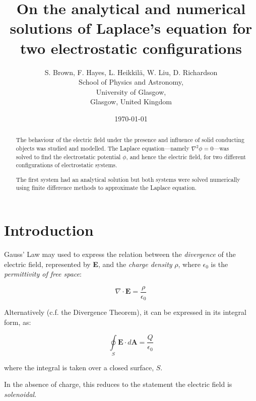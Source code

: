 \documentclass{article}
\newcommand{\be}{\begin{equation}}
\newcommand{\ee}{\end{equation}}
\begin{document}
\title{On the analytical and numerical solutions of Laplace's equation for two electrostatic configurations}
\author{S. Brown, F. Hayes, L. Heikkil{\"a}, W. Liu, D. Richardson\\
	School of Physics and Astronomy,\\
	University of Glasgow,\\
	Glasgow, United Kingdom}
\date{\today}
\maketitle

\begin{abstract}

The behaviour of the electric field under the presence and influence of solid
conducting objects was studied and modelled. The Laplace equation---namely
$\nabla ^2 \phi = 0$---was solved to find the electrostatic potential $\phi$,
and hence the electric field, for two different configurations of
electrostatic systems. 

The first system had an analytical solution but both systems were solved
numerically using finite difference methods to approximate the Laplace equation.

\end{abstract} %

\tableofcontents

\newpage

\section{Introduction}

Gauss' Law may used to express the relation between the \emph{divergence} of the
electric field, represented by \textbf{E}, and the \emph{charge density} $\rho$,
where $\epsilon_0$ is the \emph{permittivity of free space}:

\be
\nabla \cdot \bm{E} = \frac{\rho}{\epsilon_0}
\ee

Alternatively (c.f. the Divergence Theorem), it can be expressed in its
integral form, as:

\be
\oint \limits_S \bm{E} \cdot d\bm{A} = \frac{Q}{\epsilon_0}
\ee

where the integral is taken over a closed surface, $S$.

In the absence of charge, this reduces to the statement the electric field
is \emph{solenoidal}.
\end{document}
